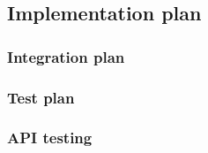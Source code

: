 \subsection{Implementation plan}
\label{sec:implementation_plan}



\subsubsection{Integration plan}
\label{sec:integration_plan}



\subsubsection{Test plan}
\label{sec:test_plan}



\subsubsection{API testing}
\label{sec:api_testing}

